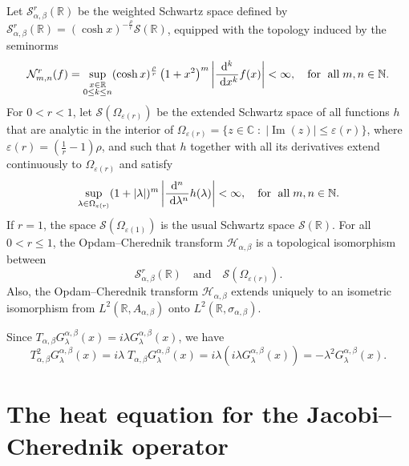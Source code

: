 \documentclass[a4paper,11pt, reqno]{amsart}
\theoremstyle{plain}
\theoremstyle{definition}
\theoremstyle{remark}
\def \R{{\mathbb R}}
\def \N{{\mathbb N}}
\def\R{\mathbb R}
\def \S{{\mathcal S}}
\def \H{{\mathcal H}}
\begin{document}
Let $\S^r_{\alpha, \beta} (\mathbb{R})$ be the weighted Schwartz space defined by $\S^r_{\alpha, \beta}(\R )=(\cosh x )^{-\frac{\rho}{r}} \S(\R)$, equipped with the topology induced by the seminorms 
\[ \mathcal{N}_{m, n}^r(f)=\sup _{\substack{x \in \mathbb{R} \\ 0 \leq k \leq n}}(\cosh x)^{\frac{ \rho}{r}}\left(1+x^2\right)^m\left|\frac{\mathrm{d}^k}{\mathrm{~d} x^k} f(x)\right| < \infty, \quad \text{for \;all\;} m, n \in \N. \]
For $0<r<1$, let $\S\left(\Omega_{\varepsilon(r)}\right)$ be the extended Schwartz space of all functions $h$ that are analytic in the interior of $\Omega_{\varepsilon(r)}=\{z \in \mathbb{C} \; : \; |\operatorname{Im}(z)| \leq \varepsilon(r)\}$, where $\varepsilon(r)=\left(\frac{1}{r}-1\right) \rho $, and such that $h$ together with all its derivatives extend continuously to $\Omega_{\varepsilon(r)}$ and satisfy 
\[\sup _{\lambda \in \Omega_{\varepsilon(r)}}(1+|\lambda|)^m \left|\frac{\mathrm{d}^n}{\mathrm{~d} \lambda^n} h(\lambda)\right|<\infty, \quad \text{for \;all\;} m, n \in \N. \]
If  $r=1$, the space $\S\left(\Omega_{\varepsilon(1)}\right)$ is the usual Schwartz space $\S(\R)$. For all $0<r \leq 1$, the Opdam--Cherednik transform $\H_{\alpha, \beta}$ is a topological isomorphism between
\begin{equation}\label{eq2}
\S^r_{\alpha, \beta}(\mathbb{R}) \quad \text{and} \quad
\S\left(\Omega_{\varepsilon(r)}\right).
\end{equation}
Also, the Opdam--Cherednik transform $\H_{\alpha, \beta}$ extends uniquely to an isometric isomorphism from $L^2(\R, A_{\alpha, \beta} )$ onto $L^2(\R, \sigma_{\alpha, \beta})$.


Since $T_{\alpha, \beta} G^{\alpha, \beta}_\lambda(x)=i \lambda  G^{\alpha, \beta}_\lambda(x)$, we have
\begin{equation}\label{eq02}
T^2_{\alpha, \beta} G^{\alpha, \beta}_\lambda(x)=i \lambda \; T_{\alpha, \beta} G^{\alpha, \beta}_\lambda(x)
=i \lambda \left( i \lambda G^{\alpha, \beta}_\lambda(x) \right)
=- \lambda^2  G^{\alpha, \beta}_\lambda(x).
\end{equation}

\section{The heat equation for the Jacobi--Cherednik operator}\label{sec3}
\end{document}
